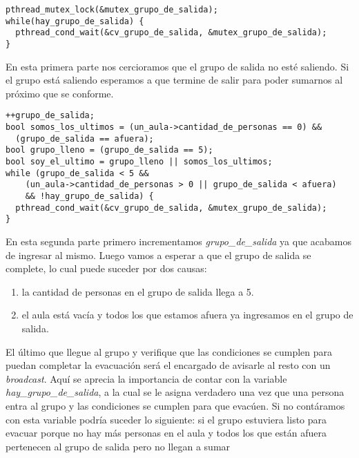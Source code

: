 \begin{center}
\begin{minipage}{1.05\textwidth}
\begin{lstlisting}[frame=lrtb]
pthread_mutex_lock(&mutex_grupo_de_salida);		
while(hay_grupo_de_salida) {
  pthread_cond_wait(&cv_grupo_de_salida, &mutex_grupo_de_salida);
}
\end{lstlisting}
\end{minipage}
\end{center}
En esta primera parte nos cercioramos que el grupo de salida no esté saliendo. Si
el grupo está saliendo esperamos a que termine de salir para poder sumarnos al próximo
que se conforme.
\begin{center}
\begin{minipage}{1.05\textwidth}
\begin{lstlisting}[frame=lrtb]
++grupo_de_salida;
bool somos_los_ultimos = (un_aula->cantidad_de_personas == 0) && 
  (grupo_de_salida == afuera);
bool grupo_lleno = (grupo_de_salida == 5);
bool soy_el_ultimo = grupo_lleno || somos_los_ultimos;
while (grupo_de_salida < 5 && 
    (un_aula->cantidad_de_personas > 0 || grupo_de_salida < afuera) 
    && !hay_grupo_de_salida) {
  pthread_cond_wait(&cv_grupo_de_salida, &mutex_grupo_de_salida);
}
\end{lstlisting}
\end{minipage}
\end{center}
En esta segunda parte primero incrementamos \textit{grupo\_de\_salida} ya que acabamos de 
ingresar al mismo. Luego vamos a esperar a que el grupo de salida se complete, lo cual
puede suceder por dos causas:
\begin{enumerate}
  \item la cantidad de personas en el grupo de salida llega a 5.
  \item el aula está vacía y todos los que estamos afuera ya ingresamos
    en el grupo de salida.
\end{enumerate}
El último que llegue al grupo y verifique que las condiciones se cumplen para puedan
completar la evacuación será el encargado de avisarle al resto con un \textit{broadcast}.
Aquí se aprecia la importancia de contar con la variable \textit{hay\_grupo\_de\_salida}, 
a la cual se le asigna verdadero una vez que una persona entra al grupo y las condiciones
se cumplen para que evacúen. Si no contáramos con esta variable podría suceder lo
siguiente: si el grupo estuviera listo para evacuar porque no hay más personas en el 
aula y todos los que están afuera pertenecen al grupo de salida pero no llegan a sumar 
